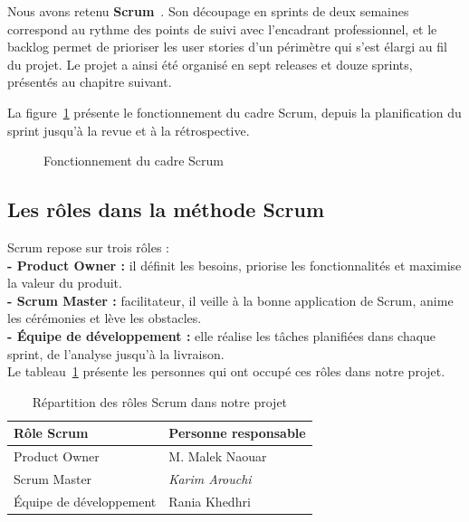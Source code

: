 Nous avons retenu \textbf{Scrum}~\cite{ScrumGuide2020}. Son découpage en sprints de deux semaines correspond au rythme des points de suivi avec l'encadrant professionnel, et le backlog permet de prioriser les user stories d'un périmètre qui s'est élargi au fil du projet. Le projet a ainsi été organisé en sept releases et douze sprints, présentés au chapitre suivant.\newline

\Needspace{12cm}
La figure~\ref{fig:fonctionnement-scrum} présente le fonctionnement du cadre Scrum, depuis la planification du sprint jusqu'à la revue et à la rétrospective.
\begin{figure}[H]
    \centering
    \caption{Fonctionnement du cadre Scrum~\cite{ScrumGuide2020}}
    \label{fig:fonctionnement-scrum}
\end{figure}

\subsection{Les rôles dans la méthode Scrum}
Scrum repose sur trois rôles :\\

\noindent \textbf{- Product Owner :} il définit les besoins, priorise les fonctionnalités et maximise la valeur du produit.\\
\noindent \textbf{- Scrum Master :} facilitateur, il veille à la bonne application de Scrum, anime les cérémonies et lève les obstacles.\\
\noindent \textbf{- Équipe de développement :} elle réalise les tâches planifiées dans chaque sprint, de l'analyse jusqu'à la livraison.\\

Le tableau~\ref{tab:roles_scrum} présente les personnes qui ont occupé ces rôles dans notre projet.
\begin{table}[H]
\centering
\renewcommand{\arraystretch}{1.4}
\begin{tabular}{|p{5cm}|p{8cm}|}
\hline
\textbf{Rôle Scrum} & \textbf{Personne responsable} \\
\hline
Product Owner & M. Malek Naouar \\
\hline
Scrum Master & \textit{Karim Arouchi} \\
\hline
Équipe de développement & Rania Khedhri \\
\hline
\end{tabular}
\caption{Répartition des rôles Scrum dans notre projet}
\label{tab:roles_scrum}
\end{table}

